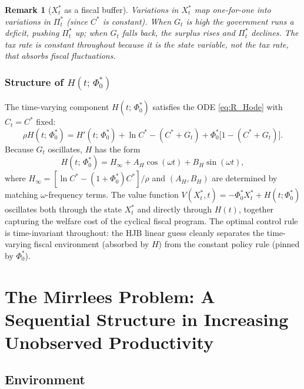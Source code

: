 \documentclass[12pt]{article}
\newtheorem{remark}{Remark}
\begin{document}
\medskip
\begin{remark}[$X_t^*$ as a fiscal buffer]
Variations in $X_t^*$ map one-for-one into variations in $\Pi_t^*$ (since
$C^*$ is constant).  When $G_t$ is high the government runs a deficit,
pushing $\Pi_t^*$ up; when $G_t$ falls back, the surplus rises and $\Pi_t^*$
declines.  The tax rate is constant throughout because it is the
\emph{state variable}, not the tax rate, that absorbs fiscal fluctuations.
\end{remark}

\subsubsection{Structure of $H(t;\, \Phi_0^*)$}

The time-varying component $H(t;\,\Phi_0^*)$ satisfies the ODE
\eqref{eq:R_Hode} with $C_t = C^*$ fixed:
\begin{equation}\label{eq:cyc_Hode}
  \rho H(t;\,\Phi_0^*)
  = H'(t;\,\Phi_0^*)
  + \ln C^* - (C^*+G_t) + \Phi_0^*\bigl[1 - (C^*+G_t)\bigr].
\end{equation}
Because $G_t$ oscillates, $H$ has the form
\begin{equation}
  H(t;\,\Phi_0^*) = H_\infty + A_H\cos(\omega t) + B_H\sin(\omega t),
\end{equation}
where $H_\infty = [\ln C^* - (1+\Phi_0^*) C^*]/\rho$ and $(A_H, B_H)$ are
determined by matching $\omega$-frequency terms.  The value function
$V(X_t^*, t) = -\Phi_0^* X_t^* + H(t;\Phi_0^*)$ oscillates both through
the state $X_t^*$ and directly through $H(t)$, together capturing the
welfare cost of the cyclical fiscal program.  The optimal control rule is
time-invariant throughout: the HJB linear guess cleanly separates the
time-varying fiscal environment (absorbed by $H$) from the constant
policy rule (pinned by $\Phi_0^*$).

\section{The Mirrlees Problem: A Sequential Structure in Increasing Unobserved Productivity}
\label{sec:mirrlees}

\subsection{Environment}
\end{document}
